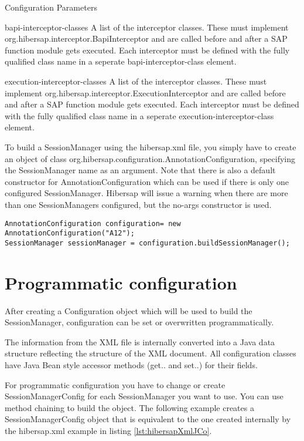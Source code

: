 \begin{descriptionBlock}{Configuration Parameters}
\begin{sloppypar}
\item[bapi-interceptor-classes]
    A list of the interceptor classes. These must implement org.hibersap.interceptor.BapiInterceptor and are called before and after a 
    SAP function module gets executed. Each interceptor must be defined with the fully qualified class name in a seperate 
    bapi-interceptor-class element.
\item[execution-interceptor-classes]
    A list of the interceptor classes. These must implement org.hibersap.interceptor.ExecutionInterceptor and are called before and after a 
    SAP function module gets executed. Each interceptor must be defined with the fully qualified class name in a seperate 
    execution-interceptor-class element.
\\
\label{tab:ConfigurationParameters}
\end{sloppypar}
\end{descriptionBlock}

To build a SessionManager using the hibersap.xml file, you simply have to create an object of
class org.\-hibersap.\-configuration.\-AnnotationConfiguration, specifying the SessionManager name as an argument. Note 
that there is also a default constructor for AnnotationConfiguration which can be used if there 
is only one configured SessionManager. Hibersap will issue a warning when there are more than one SessionManagers 
configured, but the no-args constructor is used. 

\begin{lstlisting}[label=hibersap.xml]
AnnotationConfiguration configuration= new AnnotationConfiguration("A12");
SessionManager sessionManager = configuration.buildSessionManager();
\end{lstlisting}


\section{Programmatic configuration}
\label{sec:Programmatic configuration}

After creating a Configuration object which will be used to build the SessionManager, configuration can be set or
overwritten programmatically.

The information from the XML file is internally converted into a Java data structure reflecting the structure of the
XML document. All configuration classes have Java Bean style accessor methods (get.. and set..) for
their fields. 

For programmatic configuration you have to change or create SessionManagerConfig for each 
SessionManager you want to use. You can use method chaining to build the
object. The following example creates a  SessionManagerConfig object that is equivalent to the one created internally by the
hibersap.xml example in listing \ref{lst:hibersapXmlJCo}. 

